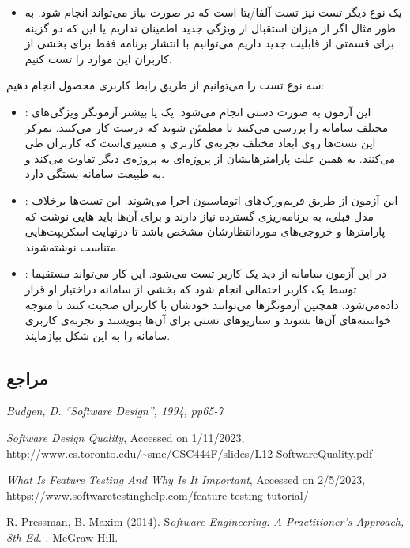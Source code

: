{\begin{itemize}
\item
یک نوع دیگر تست نیز تست آلفا/بتا است که در صورت نیاز می‌تواند انجام شود. به طور مثال اگر از میزان استقبال از ویژگی جدید اطمینان نداریم یا این که دو گزینه برای قسمتی از قابلیت جدید داریم می‌توانیم با انتشار برنامه فقط برای بخشی از کاربران این موارد را تست کنیم.
 
  
\end{itemize}
	
	
سه نوع تست را می‌توانیم از طریق رابط کاربری محصول انجام دهیم:
\begin{itemize}
\item {}:
این آزمون به صورت دستی انجام می‌شود. یک یا بیشتر آزمونگر ویژگی‌های مختلف سامانه را بررسی می‌کنند تا مطمئن شوند که درست کار می‌کنند. تمرکز این تست‌ها روی ابعاد مختلف تجربه‌ی کاربری و مسیری‌است که کاربران طی می‌کنند. به همین علت پارامترهایشان از پروژه‌ای به پروژه‌ی دیگر تفاوت می‌کند و به طبیعت سامانه‌ بستگی دارد.
\item {}:
این آزمون از طریق فریم‌ورک‌های اتوماسیون اجرا می‌شوند. این تست‌ها برخلاف مدل قبلی، به برنامه‌ریزی گسترده نیاز دارند و برای آن‌ها باید
هایی نوشت که پارامترها و خروجی‌های موردانتظارشان مشخص باشد تا درنهایت اسکریپت‌هایی متناسب نوشته‌شوند.
\item {}:
در این آزمون سامانه از دید یک کاربر تست می‌شود. این کار می‌تواند مستقیما توسط یک کاربر احتمالی انجام شود که بخشی از سامانه دراختیار او قرار داده‌می‌شود. همچنین آزمونگرها می‌توانند خودشان با کاربران صحبت کنند تا متوجه خواسته‌های آن‌ها بشوند و سناریوهای تستی برای آن‌ها بنویسند و تجربه‌ی کاربری سامانه را به این شکل بیازمایند.
\end{itemize}

\subsection*{مراجع}

\begin{latin}
	\begingroup
	\renewcommand{\section}[2]{}%
	
\begin{thebibliography}{9}
	\textit{Budgen, D. “Software Design”, 1994, pp65-7}
	
	\textit{Software Design Quality},
	Accessed on 1/11/2023,
	\url{http://www.cs.toronto.edu/~sme/CSC444F/slides/L12-SoftwareQuality.pdf}

\textit{What Is Feature Testing And Why Is It Important},
Accessed on 2/5/2023,
\url{	https://www.softwaretestinghelp.com/feature-testing-tutorial/}
	
R. Pressman,   B. Maxim (2014).
S\textit{oftware Engineering: A Practitioner’s Approach, 8th Ed. }.
McGraw-Hill.

\end{thebibliography}
\endgroup
\end{latin}

}
